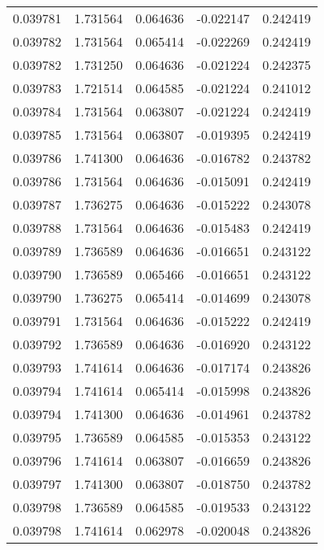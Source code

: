 \begin{tabular}{lrrrr}
0.039781    &  1.731564 &  0.064636 & -0.022147 &             0.242419 \\
0.039782    &  1.731564 &  0.065414 & -0.022269 &             0.242419 \\
0.039782    &  1.731250 &  0.064636 & -0.021224 &             0.242375 \\
0.039783    &  1.721514 &  0.064585 & -0.021224 &             0.241012 \\
0.039784    &  1.731564 &  0.063807 & -0.021224 &             0.242419 \\
0.039785    &  1.731564 &  0.063807 & -0.019395 &             0.242419 \\
0.039786    &  1.741300 &  0.064636 & -0.016782 &             0.243782 \\
0.039786    &  1.731564 &  0.064636 & -0.015091 &             0.242419 \\
0.039787    &  1.736275 &  0.064636 & -0.015222 &             0.243078 \\
0.039788    &  1.731564 &  0.064636 & -0.015483 &             0.242419 \\
0.039789    &  1.736589 &  0.064636 & -0.016651 &             0.243122 \\
0.039790    &  1.736589 &  0.065466 & -0.016651 &             0.243122 \\
0.039790    &  1.736275 &  0.065414 & -0.014699 &             0.243078 \\
0.039791    &  1.731564 &  0.064636 & -0.015222 &             0.242419 \\
0.039792    &  1.736589 &  0.064636 & -0.016920 &             0.243122 \\
0.039793    &  1.741614 &  0.064636 & -0.017174 &             0.243826 \\
0.039794    &  1.741614 &  0.065414 & -0.015998 &             0.243826 \\
0.039794    &  1.741300 &  0.064636 & -0.014961 &             0.243782 \\
0.039795    &  1.736589 &  0.064585 & -0.015353 &             0.243122 \\
0.039796    &  1.741614 &  0.063807 & -0.016659 &             0.243826 \\
0.039797    &  1.741300 &  0.063807 & -0.018750 &             0.243782 \\
0.039798    &  1.736589 &  0.064585 & -0.019533 &             0.243122 \\
0.039798    &  1.741614 &  0.062978 & -0.020048 &             0.243826 \\

\end{tabular}
